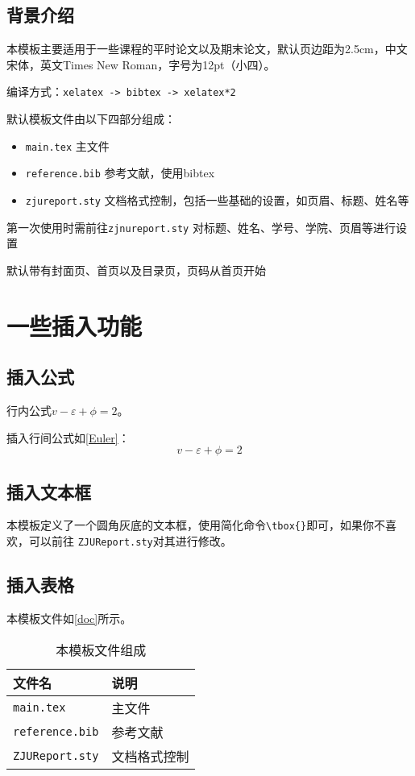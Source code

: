 \documentclass[12pt,hyperref,a4paper,UTF8]{ctexart}
\begin{document}
\subsection{背景介绍}
本模板主要适用于一些课程的平时论文以及期末论文，默认页边距为2.5cm，中文宋体，英文Times New Roman，字号为12pt（小四）。

编译方式：\verb|xelatex -> bibtex -> xelatex*2|


默认模板文件由以下四部分组成：
\begin{itemize}
    \item \texttt{main.tex} 主文件
    \item \texttt{reference.bib} 参考文献，使用bibtex
    \item \texttt{zjureport.sty} 文档格式控制，包括一些基础的设置，如页眉、标题、姓名等
\end{itemize}

第一次使用时需前往\texttt{zjnureport.sty} 对标题、姓名、学号、学院、页眉等进行设置

默认带有封面页、首页以及目录页，页码从首页开始

\section{一些插入功能}
\subsection{插入公式}
行内公式$v-\varepsilon+\phi=2$。

插入行间公式如\autoref{Euler}：
\begin{equation}
    v-\varepsilon+\phi=2
    \label{Euler}
\end{equation}


\subsection{插入文本框}
本模板定义了一个圆角灰底的文本框，使用简化命令\verb|\tbox{}|即可，如果你不喜欢，可以前往 \texttt{ZJUReport.sty}对其进行修改。


\subsection{插入表格}
本模板文件如\autoref{doc}所示。
\begin{table}[!htbp]
    \centering
    \begin{tabular}{l  | l}
    \hline
        文件名 & 说明 \\
        \hline
        \texttt{main.tex}  & 主文件 \\
        \texttt{reference.bib} & 参考文献 \\
        \texttt{ZJUReport.sty}  & 文档格式控制\\
        \hline
    \end{tabular}
    \caption{本模板文件组成}
    \label{doc}
\end{table}
\end{document}
